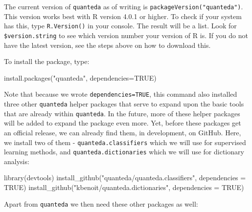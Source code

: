 \documentclass[
]{book}
\newenvironment{Shaded}{\begin{snugshade}}{\end{snugshade}}
\newcommand{\AttributeTok}[1]{\textcolor[rgb]{0.77,0.63,0.00}{#1}}
\newcommand{\ConstantTok}[1]{\textcolor[rgb]{0.00,0.00,0.00}{#1}}
\newcommand{\FunctionTok}[1]{\textcolor[rgb]{0.00,0.00,0.00}{#1}}
\newcommand{\NormalTok}[1]{#1}
\newcommand{\StringTok}[1]{\textcolor[rgb]{0.31,0.60,0.02}{#1}}
\begin{document}
The current version of \texttt{quanteda} as of writing is \texttt{packageVersion("quanteda")}. This version works best with R version 4.0.1 or higher. To check if your system has this, type \texttt{R.Version()} in your console. The result will be a list. Look for \texttt{\$version.string} to see which version number your version of R is. If you do not have the latest version, see the steps above on how to download this.

To install the package, type:

\begin{Shaded}
\begin{Highlighting}[]
\FunctionTok{install.packages}\NormalTok{(}\StringTok{"quanteda"}\NormalTok{, }\AttributeTok{dependencies=}\ConstantTok{TRUE}\NormalTok{)}
\end{Highlighting}
\end{Shaded}

Note that because we wrote \texttt{dependencies=TRUE}, this command also installed three other \texttt{quanteda} helper packages that serve to expand upon the basic tools that are already within \texttt{quanteda}. In the future, more of these helper packages will be added to expand the package even more. Yet, before these packages get an official release, we can already find them, in development, on GitHub. Here, we install two of them - \texttt{quanteda.classifiers} which we will use for supervised learning methods, and \texttt{quanteda.dictionaries} which we will use for dictionary analysis:

\begin{Shaded}
\begin{Highlighting}[]
\FunctionTok{library}\NormalTok{(devtools)}
\FunctionTok{install\_github}\NormalTok{(}\StringTok{"quanteda/quanteda.classifiers"}\NormalTok{, }\AttributeTok{dependencies =} \ConstantTok{TRUE}\NormalTok{)}
\FunctionTok{install\_github}\NormalTok{(}\StringTok{"kbenoit/quanteda.dictionaries"}\NormalTok{, }\AttributeTok{dependencies =} \ConstantTok{TRUE}\NormalTok{)}
\end{Highlighting}
\end{Shaded}

Apart from \texttt{quanteda} we then need these other packages as well:
\end{document}
